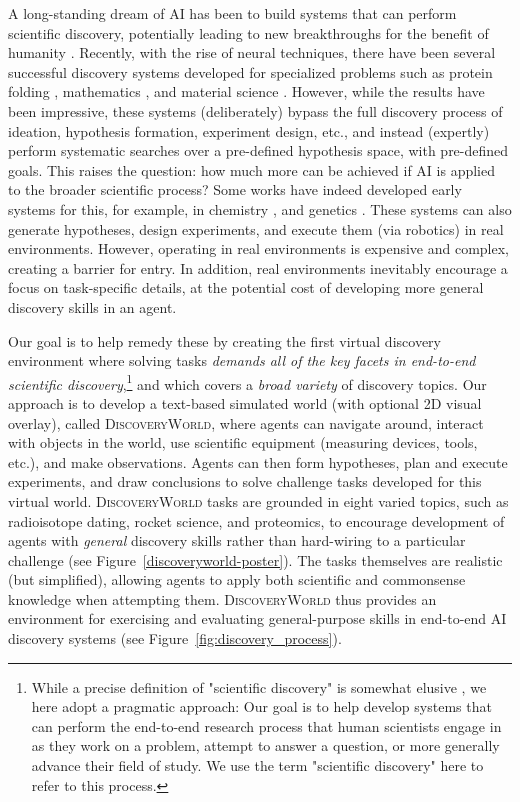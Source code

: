 \documentclass{article}
\newcommand{\env}{\textsc{DiscoveryWorld}\xspace}
\begin{document}
A long-standing dream of AI has been to build systems that can perform scientific
discovery, potentially leading to new breakthroughs for the benefit of humanity \citep{kitano2016artificial}.
Recently, with the rise of neural techniques, there have been several successful discovery
systems developed for specialized problems such as protein folding \citep{Jumper2021HighlyAP,Krishna2023GeneralizedBM},
mathematics \citep{RomeraParedes2023MathematicalDF}, and material science \citep{Sendek2018MachineLD}. However, while
the results have been impressive, these systems (deliberately) bypass the full
discovery process of ideation, hypothesis formation, experiment design, etc.,
and instead (expertly) perform systematic searches over a pre-defined hypothesis space,
with pre-defined goals. This raises the question: how much more can be
achieved if AI is applied to the broader scientific process?
Some works have indeed developed early systems for this, for example, in chemistry \citep{Boiko2023AutonomousCR}, and genetics \citep{King2004FunctionalGH}.
These systems can also generate hypotheses, design experiments, and execute
them (via robotics) in real environments. However, operating in real environments is
expensive and complex, creating a barrier for entry. In addition, real environments
inevitably encourage a focus on task-specific details, at the potential cost of
developing more general discovery skills in an agent.

Our goal is to help remedy these by creating the first virtual discovery environment
where solving tasks {\it demands all of the key facets in end-to-end
scientific discovery},\footnote{
   While a precise definition of "scientific discovery" is somewhat elusive
   \citep[][]{langley1987scientific,popper2005logic}, we here adopt a pragmatic
   approach: Our goal is to help develop systems that can perform the end-to-end
   research process that human scientists engage in as they work on a problem,
   attempt to answer a question, or more generally advance their field of study.
   We use the term "scientific discovery" here to refer to this process.}
and which covers a {\it broad variety} of discovery topics.
Our approach is to develop a text-based simulated world (with optional 2D visual overlay), called \env,
where agents can navigate around, interact with objects in the world,
use scientific equipment (measuring devices, tools, etc.), and make observations.
Agents can then form hypotheses, plan and execute experiments, and draw conclusions
to solve challenge tasks developed for this virtual world.
\env tasks are grounded in eight varied topics,
such as radioisotope dating, rocket science, and proteomics, to encourage
development of agents with {\it general} discovery skills rather than hard-wiring
to a particular challenge (see Figure~\ref{discoveryworld-poster}).
The tasks themselves are realistic (but simplified),
allowing agents to apply both scientific and commonsense
knowledge when attempting them.
\env thus provides an environment for exercising and evaluating
general-purpose skills in end-to-end AI discovery systems (see Figure~\ref{fig:discovery_process}).
\end{document}
